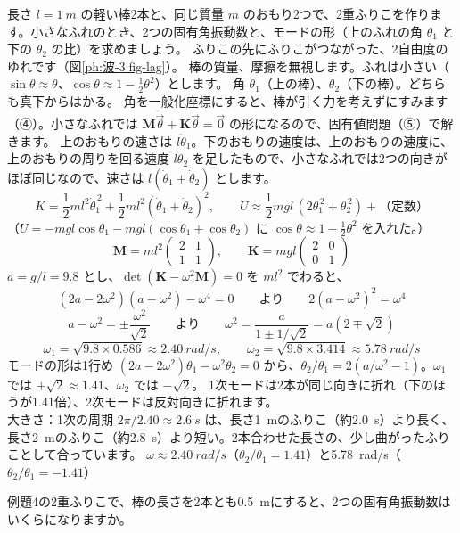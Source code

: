 \label{ph:波-3:ex4}
\begin{phreidai}[2重ふりこのモード]
長さ $l=\qty{1}{m}$ の軽い棒2本と、同じ質量 $m$ のおもり2つで、2重ふりこを作ります。小さなふれのとき、2つの固有角振動数と、モードの形（上のふれの角 $\theta_1$ と下の $\theta_2$ の比）を求めましょう。
\phbamen
ふりこの先にふりこがつながった、2自由度のゆれです（図\ref{ph:波-3:fig-lag}）。
\phmushi
棒の質量、摩擦を無視します。ふれは小さい（$\sin\theta\approx\theta$、$\cos\theta\approx1-\tfrac12\theta^2$）とします。
\phzu
角 $\theta_1$（上の棒）、$\theta_2$（下の棒）。どちらも真下からはかる。
\phriyu
角を一般化座標にすると、棒が引く力を考えずにすみます（④）。小さなふれでは $\mathbf M\ddot{\vec\theta}+\mathbf K\vec\theta=\vec 0$ の形になるので、固有値問題（⑤）で解きます。
\phtateru
上のおもりの速さは $l\dot\theta_1$。下のおもりの速度は、上のおもりの速度に、上のおもりの周りを回る速度 $l\dot\theta_2$ を足したもので、小さなふれでは2つの向きがほぼ同じなので、速さは $l(\dot\theta_1+\dot\theta_2)$ とします。
\[K=\frac12ml^2\dot\theta_1^{\,2}+\frac12ml^2(\dot\theta_1+\dot\theta_2)^2,\qquad U\approx\frac12mgl\,(2\theta_1^{\,2}+\theta_2^{\,2})+\text{（定数）}\]
（$U=-mgl\cos\theta_1-mgl(\cos\theta_1+\cos\theta_2)$ に $\cos\theta\approx1-\tfrac12\theta^2$ を入れた。）
\[\mathbf M=ml^2\begin{pmatrix}2&1\\1&1\end{pmatrix},\qquad\mathbf K=mgl\begin{pmatrix}2&0\\0&1\end{pmatrix}\]
\phtoku
$a=g/l=9.8$ とし、$\det(\mathbf K-\omega^2\mathbf M)=0$ を $ml^2$ でわると、
\[(2a-2\omega^2)(a-\omega^2)-\omega^4=0\qquad\text{より}\qquad2(a-\omega^2)^2=\omega^4\]
\[a-\omega^2=\pm\frac{\omega^2}{\sqrt2}\qquad\text{より}\qquad\omega^2=\frac{a}{1\pm1/\sqrt2}=a(2\mp\sqrt2)\]
\[\omega_1=\sqrt{9.8\times0.586}\approx\qty{2.40}{rad/s},\qquad\omega_2=\sqrt{9.8\times3.414}\approx\qty{5.78}{rad/s}\]
モードの形は1行め $(2a-2\omega^2)\theta_1-\omega^2\theta_2=0$ から、$\theta_2/\theta_1=2(a/\omega^2-1)$。$\omega_1$ では $+\sqrt2\approx1.41$、$\omega_2$ では $-\sqrt2$。
\phtashikame
1次モードは2本が同じ向きに折れ（下のほうが1.41倍）、2次モードは反対向きに折れます。\\
大きさ：1次の周期 $2\pi/2.40\approx\qty{2.6}{s}$ は、長さ\qty{1}{m}のふりこ（約\qty{2.0}{s}）より長く、長さ\qty{2}{m}のふりこ（約\qty{2.8}{s}）より短い。2本合わせた長さの、少し曲がったふりことして合っています。
\kotae $\omega\approx\qty{2.40}{rad/s}$（$\theta_2/\theta_1=1.41$）と\qty{5.78}{rad/s}（$\theta_2/\theta_1=-1.41$）
\end{phreidai}
\begin{jibun}
例題4の2重ふりこで、棒の長さを2本とも\qty{0.5}{m}にすると、2つの固有角振動数はいくらになりますか。
\end{jibun}

